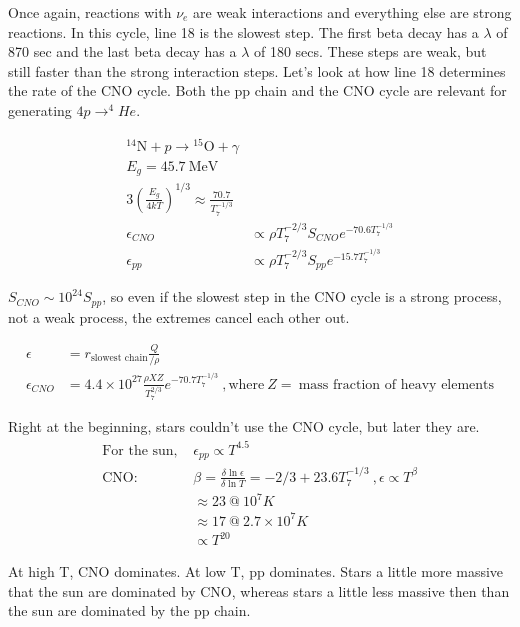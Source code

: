 Once again, reactions with $\nu_e$ are weak interactions and everything else are strong reactions. In this cycle, line 18 is the slowest step. The first beta decay has a $\lambda$ of 870 sec and the last beta decay has a $\lambda$ of 180 secs. These steps are weak, but still faster than the strong interaction steps. Let's look at how line 18 determines the rate of the CNO cycle. Both the pp chain and the CNO cycle are relevant for generating $ 4p \rightarrow ^4He$. 

\begin{align}
\textrm{$^{14}$N} + p \rightarrow  \textrm{$^{15}$O} + \gamma \\
E_g = 45.7 ~\text{MeV}\\
3 \left( \frac{E_g}{4kT}\right)^{1/3} \approx \frac{70.7}{T_7^{-1/3}}\\
\epsilon_{CNO} & \propto \rho T_7^{-2/3} S_{CNO} e^{-70.6 T_7^{-1/3}}\\
\epsilon_{pp}& \propto \rho T_7^{-2/3} S_{pp}e^{-15.7 T_7^{-1/3}}
\end{align}

$S_{CNO} \sim 10^{24} S_{pp}$, so even if the slowest step in the CNO cycle is a strong process, not a weak process, the extremes cancel each other out. 

\begin{align}
\epsilon &= r_{\text{slowest chain}} \frac{Q}{/\rho}\\
\epsilon_{CNO} &= 4.4 \times 10^{27} \frac{\rho XZ}{T_7^{2/3}} e^{-70.7 T_7 ^{-1/3}}~,\text{where}~ Z = ~\text{mass fraction of heavy elements}
\end{align}

Right at the beginning, stars couldn't use the CNO cycle, but later they are. \\

\begin{align}
\text{For the sun, } &\epsilon_{pp} \propto T^{4.5}\\
\text{CNO:} &\beta = \frac{\delta \ln \epsilon}{\delta \ln T} = -2/3 + 23.6 T_7^{-1/3}~, \epsilon \propto T^\beta\\
& \approx 23~ @~ 10^7 K\\
& \approx 17~@~ 2.7 \times 10^7K\\
& \propto T^{20}
\end{align}

At high T, CNO dominates. At low T, pp dominates. Stars a little more massive that the sun are dominated by CNO, whereas stars a little less massive then than the sun are dominated by the pp chain. \\

